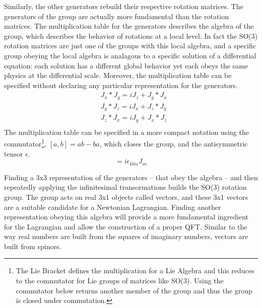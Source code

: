 Similarly, the other generators rebuild their respective rotation matrices. The generators of the group are actually more fundamental than the rotation matrices. The multiplication table for the generators describes the algebra of the group, which describes the behavior of rotations at a local level. In fact the SO(3) rotation matrices are just one of the groups with this local algebra, and a specific group obeying the local algebra is analagous to a specific solution of a differential equation: each solution has a different global behavior yet each obeys the same physics at the differential scale. Moreover, the multiplication table can be specified without declaring any particular representation for the generators. 
\begin{equation}
\begin{split}
&J_x*J_y = iJ_z  + J_y*J_x \\
&J_y*J_z = iJ_x  + J_z*J_y \\
&J_z*J_x = iJ_y  + J_x*J_z \\
\end{split}
\end{equation}
The multiplication table can be specified in a more compact notation using the commutator\footnote{The Lie Bracket defines the multiplication for a Lie Algebra and this reduces to the commutator for Lie groups of matrices like SO(3). Using the commutator below returns another member of the group and thus the group is closed under commutation.}, $[a,b] = ab - ba$, which closes the group, and the antisymmetric tensor $\epsilon$.
\begin{equation}
[J_k, J_l] = i\epsilon_{klm}J_m
\end{equation}

Finding a 3x3 representation of the generators -- that obey the algebra -- and then repeatedly applying the infinitesimal transormations builds the SO(3) rotation group. The group acts on real 3x1 objects called vectors, and these 3x1 vectors are a suitable candidate for a Newtonian Lagrangian. Finding another representation obeying this algebra will provide a more fundamental ingredient for the Lagrangian and allow the construction of a proper QFT. Similar to the way real numbers are built from the squares of imaginary numbers, vectors are built from spinors. 

